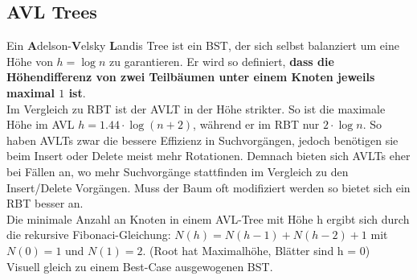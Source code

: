 \documentclass[
../../AuD-Zusammenfassung.tex,
]
{subfiles}
\begin{document}
\subsection{AVL Trees}
Ein \textbf{A}delson-\textbf{V}elsky \textbf{L}andis Tree ist ein BST, der sich selbst balanziert um eine Höhe von $h = \log n$ zu garantieren. Er wird so definiert, \textbf{dass die Höhendifferenz von zwei Teilbäumen unter einem Knoten jeweils maximal $1$ ist}.\\
Im Vergleich zu RBT ist der AVLT in der Höhe strikter. So ist die maximale Höhe im AVL $h = 1.44 \cdot \log (n + 2)$, während er im RBT nur $2 \cdot \log n$. So haben AVLTs zwar die bessere Effizienz in Suchvorgängen, jedoch benötigen sie beim Insert oder Delete meist mehr Rotationen. Demnach bieten sich AVLTs eher bei Fällen an, wo mehr Suchvorgänge stattfinden im Vergleich zu den Insert/Delete Vorgängen. Muss der Baum oft modifiziert werden so bietet sich ein RBT besser an.\\ Die minimale Anzahl an Knoten in einem AVL-Tree mit Höhe h ergibt sich durch die rekursive Fibonaci-Gleichung: $N(h) = N(h - 1) + N(h - 2) + 1$ mit $N(0) = 1$ und $N(1) = 2$. (Root hat Maximalhöhe, Blätter sind h = 0)\\

Visuell gleich zu einem Best-Case ausgewogenen BST. \\
\begin{minipage}[t]{0.5\textwidth}
    \centering
\end{minipage}
\end{document}
